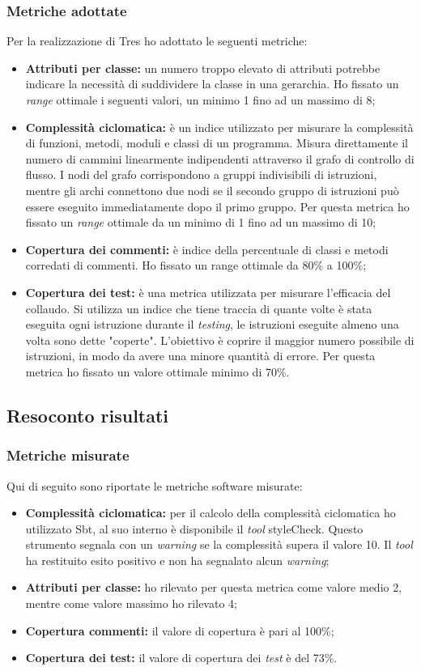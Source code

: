 \subsubsection{Metriche adottate}
Per la realizzazione di Tres ho adottato le seguenti metriche:
\begin{itemize}
\item \textbf{Attributi per classe:}  un numero troppo elevato di attributi potrebbe indicare la necessità di suddividere la classe in una gerarchia. Ho fissato un \emph{range} ottimale i seguenti valori, un minimo 1 fino ad un massimo di 8;
\item \textbf{Complessità ciclomatica:} è un indice utilizzato per misurare la complessità di funzioni, metodi, moduli e classi di un programma. Misura direttamente il numero di cammini linearmente indipendenti attraverso il grafo di controllo di flusso. I nodi del grafo corrispondono a gruppi indivisibili di istruzioni, mentre gli archi connettono due nodi se il secondo gruppo di istruzioni può essere eseguito immediatamente dopo il primo gruppo. Per questa metrica ho fissato un \textit{range} ottimale da un minimo di 1 fino ad un massimo di 10;
\newpage
\item \textbf{Copertura dei commenti:} è indice della percentuale di classi e metodi corredati di commenti. Ho fissato un range ottimale da 80\% a 100\%;
\item \textbf{Copertura dei test:} è una metrica utilizzata per misurare l'efficacia del collaudo. Si utilizza un indice che tiene traccia di quante volte è stata eseguita ogni istruzione durante il \emph{testing}, le istruzioni eseguite almeno una volta sono dette "coperte". L'obiettivo è coprire il maggior numero possibile di istruzioni, in modo da avere una minore quantità di errore. Per questa metrica ho fissato un valore ottimale minimo di 70\%.
\end{itemize}
\subsection{Resoconto risultati}
\subsubsection{Metriche misurate}
Qui di seguito sono riportate le metriche software misurate:
\begin{itemize}
\item \textbf{Complessità ciclomatica:} per il calcolo della complessità ciclomatica ho utilizzato Sbt, al suo interno è disponibile il \emph{tool} styleCheck. Questo strumento segnala con un \emph{warning} se la complessità supera il valore 10. Il \emph{tool} ha restituito esito positivo e non ha segnalato alcun \emph{warning};
\item \textbf{Attributi per classe:} ho rilevato per questa metrica come valore medio 2, mentre come valore massimo ho rilevato 4;
\item \textbf{Copertura commenti:} il valore di copertura è pari al 100\%;
\item \textbf{Copertura dei test:} il valore di copertura dei \emph{test} è del 73\%.
\end{itemize}
